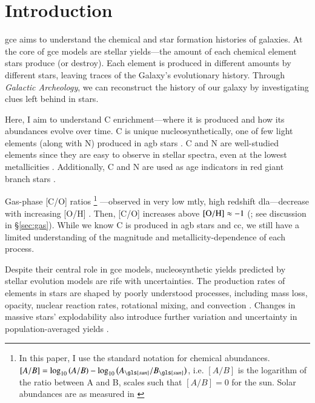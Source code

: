 \documentclass[12pt,oneside,letterpaper]{report}
\newcommand{\cc}{\gls{cc}}
\newcommand{\agb}{\gls{agb}}
\newcommand{\dla}{\gls{dla}}
\newcommand{\gce}{\gls{gce}}
\newcommand{\Gce}{\Gls{gce}}
\newcommand{\sun}{\gls{sun}}
\begin{document}

\tableofcontents
\listoffigures
\listoftables
\newpage
{}









\chapter{Introduction}

\Gce{} aims to understand the chemical and star formation histories of galaxies. At the core of \gce{} models are stellar yields---the amount of each chemical element stars produce (or destroy). Each element is produced in different amounts by different stars, leaving traces of the Galaxy's evolutionary history. Through \textit{Galactic Archeology}, we can reconstruct the history of our galaxy by investigating clues left behind in stars.

Here, I aim to understand C enrichment---where it is produced and how its abundances evolve over time. C is unique nucleosynthetically, one of few light elements (along with N) produced in \agb{} stars \citep[e.g.][]{jennifer19, KL14}. C and N are well-studied elements since they are easy to observe in stellar spectra, even at the lowest metallicities \cite[e.g.][]{fabbian+09, nissen+14, lambert81, laird85, lambert86}. Additionally, C and N are used as age indicators in red giant branch stars \citep{martig16, MG15, hasselquist19, vincenzo+21}.

Gas-phase [C/O] ratios%
%
\footnote{In this paper, I use the standard notation for chemical abundances. $[A/B] = \log_{10}\left(A/B\right) - \log_{10}\left(A_{\sun}/B_{\sun}\right)$, i.e. $[A/B]$ is the logarithm of the ratio between A and B, scales such that $[A/B]=0$ for the sun. Solar abundances are as measured in \citet{asplund+09}}%
%
---observed in very low \gls{mtly}, high redshift \dla---decrease with increasing [O/H] \citep{FN15, cooke+17}. Then, [C/O] increases above $\rm [O/H] \approx -1$ (\citealt{berg+19}; see discussion in \S\ref{sec:gas}).
While we know C is produced in \agb{} stars and \cc{}, we still have a limited understanding of the magnitude and metallicity-dependence of each process.


Despite their central role in \gce{} models, nucleosynthetic yields predicted by stellar evolution models are rife with uncertainties. The production rates of elements in stars are shaped by poorly understood processes, including mass loss, opacity, nuclear reaction rates, rotational mixing, and convection \citep{KL14,ventura+13, LC18}.
Changes in massive stars' explodability also introduce further variation and uncertainty in population-averaged yields \citep{emily+21}.
\end{document}
